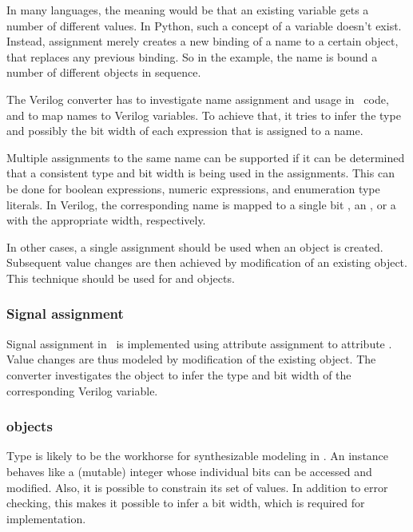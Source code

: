 In many languages, the meaning would be that an
existing variable  gets a number of different values.
In Python, such a concept of a variable doesn't exist. Instead,
assignment merely creates a new binding of a name to a
certain object, that replaces any previous binding.
So in the example, the name  is bound a 
number of different objects in sequence.

The Verilog converter has to investigate name
assignment and usage in \myhdl\ code, and to map
names to Verilog variables. To achieve that,
it tries to infer the type and possibly the
bit width of each expression that is assigned
to a name.

Multiple assignments to the same name can be supported if it can be
determined that a consistent type and bit width is being used in the
assignments. This can be done for boolean expressions, numeric
expressions, and enumeration type literals. In Verilog, the
corresponding name is mapped to a single bit , an
, or a  with the appropriate width, respectively.

In other cases, a single assignment should be used when an object is
created. Subsequent value changes are then achieved by modification of
an existing object.  This technique should be used for 
and  objects.

\subsubsection{Signal assignment\label{conv-meth-assign-signal}}

Signal assignment in \myhdl\ is implemented using attribute assignment
to attribute .  Value changes are thus modeled by
modification of the existing object. The converter investigates the
 object to infer the type and bit width of the
corresponding Verilog variable.

\subsubsection{ objects\label{conv-meth-assign-intbv}}

Type  is likely to be the workhorse for synthesizable
modeling in \myhdl{}. An  instance behaves like a
(mutable) integer whose individual bits can be accessed and
modified. Also, it is possible to constrain its set of values. In
addition to error checking, this makes it possible to infer a bit
width, which is required for implementation.

